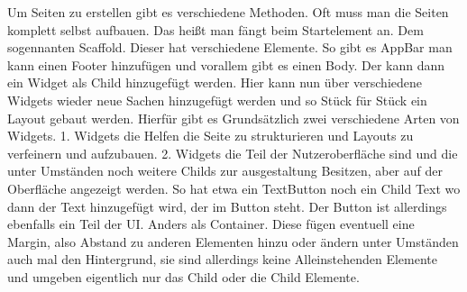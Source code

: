 Um Seiten zu erstellen gibt es verschiedene Methoden. Oft muss man die Seiten komplett selbst aufbauen. Das heißt man fängt beim Startelement an. Dem sogennanten Scaffold. Dieser hat verschiedene Elemente. So gibt es AppBar man kann einen Footer hinzufügen und vorallem gibt es einen Body. Der kann dann ein Widget als Child hinzugefügt werden. Hier kann nun über verschiedene Widgets wieder neue Sachen hinzugefügt werden und so Stück für Stück ein Layout gebaut werden. 
Hierfür gibt es Grundsätzlich zwei verschiedene Arten von Widgets. 
1. Widgets die Helfen die Seite zu strukturieren und Layouts zu verfeinern und aufzubauen.
2. Widgets die Teil der Nutzeroberfläche sind und die unter Umständen noch weitere Childs zur ausgestaltung Besitzen, aber auf der Oberfläche angezeigt werden. So hat etwa ein TextButton noch ein Child Text wo dann der Text hinzugefügt wird, der im Button steht. Der Button ist allerdings ebenfalls ein Teil der UI. Anders als Container. Diese fügen eventuell eine Margin, also Abstand zu anderen Elementen hinzu oder ändern unter Umständen auch mal den Hintergrund, sie sind allerdings keine Alleinstehenden Elemente und umgeben eigentlich nur das Child oder die Child Elemente.





